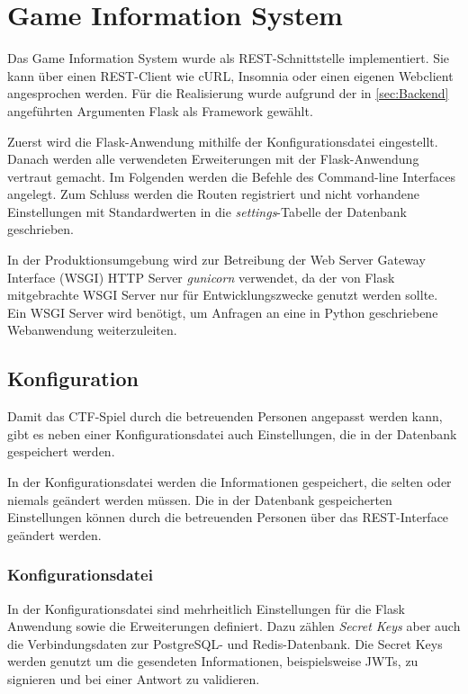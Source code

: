 \textbf{}\section{Game Information System}
Das Game Information System wurde als REST-Schnittstelle implementiert. Sie kann über einen REST-Client wie cURL, Insomnia oder einen eigenen Webclient angesprochen werden. Für die Realisierung wurde aufgrund der in \autoref{sec:Backend} angeführten Argumenten Flask als Framework gewählt.

Zuerst wird die Flask-Anwendung mithilfe der Konfigurationsdatei eingestellt. Danach werden alle verwendeten Erweiterungen mit der Flask-Anwendung vertraut gemacht. Im Folgenden werden die Befehle des Command-line Interfaces angelegt. Zum Schluss werden die Routen registriert und nicht vorhandene Einstellungen mit Standardwerten in die \textit{settings}-Tabelle der Datenbank geschrieben.

In der Produktionsumgebung wird zur Betreibung der Web Server Gateway Interface (WSGI) HTTP Server \textit{gunicorn} verwendet, da der von Flask mitgebrachte WSGI Server nur für Entwicklungszwecke genutzt werden sollte. Ein WSGI Server wird benötigt, um Anfragen an eine in Python geschriebene Webanwendung weiterzuleiten.

\subsection{Konfiguration}
Damit das CTF-Spiel durch die betreuenden Personen angepasst werden kann, gibt es neben einer Konfigurationsdatei auch Einstellungen, die in der Datenbank gespeichert werden.

In der Konfigurationsdatei werden die Informationen gespeichert, die selten oder niemals geändert werden müssen. Die in der Datenbank gespeicherten Einstellungen können durch die betreuenden Personen über das REST-Interface geändert werden.

\subsubsection{Konfigurationsdatei}
In der Konfigurationsdatei sind mehrheitlich Einstellungen für die Flask Anwendung sowie die Erweiterungen definiert. Dazu zählen \textit{Secret Keys} aber auch die Verbindungsdaten zur PostgreSQL- und Redis-Datenbank. Die Secret Keys werden genutzt um die gesendeten Informationen, beispielsweise JWTs, zu signieren und bei einer Antwort zu validieren.

